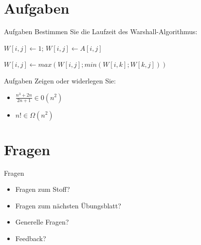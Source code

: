 	
	\section{Aufgaben}
	\begin{frame}{Aufgaben}
		Bestimmen Sie die Laufzeit des Warshall-Algorithmus:
		
		\small
            \begin{algorithmic}
							\State $W[i,j] \gets 1$;
						\Else
							\State $W[i,j] \gets A[i,j]$
						\EndIf
					\EndFor
				\EndFor
            \end{algorithmic}
            \begin{algorithmic}
							\State $W[i , j ] \gets  max(W[i , j ]; min(W[i , k];W[k, j ]) )$
						\EndFor
					\EndFor
				\EndFor
            \end{algorithmic}
	\end{frame}
	
	
	\begin{frame}{Aufgaben}
		Zeigen oder widerlegen Sie:\\
		\vspace{10pt}
		\begin{itemize}
			\item $\frac{n^3+2n}{2n+1} \in 0(n^2)$
			\item $n! \in \Omega(n^2)$
		\end{itemize}
	\end{frame}
	
	
	\section{Fragen}
	\begin{frame} {Fragen}
		\begin{itemize}
			\item Fragen zum Stoff?
			\item Fragen zum n\"achsten \"Ubungsblatt?
			\item Generelle Fragen?
			\item Feedback?
		\end{itemize}
	\end{frame}

